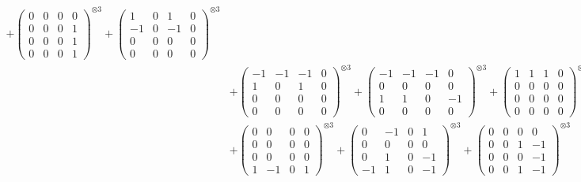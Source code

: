 \documentclass{article}
\begin{document}
{\begin{align}
            + \begin{pmatrix} 0 & 0 & 0 & 0 \\ 0 & 0 & 0 & 1 \\ 0 & 0 & 0 & 1 \\ 0 & 0 & 0 & 1 \end{pmatrix}^{\otimes 3} 
            + \begin{pmatrix} 1 & 0 & 1 & 0 \\ -1 & 0 & -1 & 0 \\ 0 & 0 & 0 & 0 \\ 0 & 0 & 0 & 0 \end{pmatrix}^{\otimes 3} \\
        &+ \label{Rs16-Rc11-Solution-16-c10} \begin{pmatrix} -1 & -1 & -1 & 0 \\ 1 & 0 & 1 & 0 \\ 0 & 0 & 0 & 0 \\ 0 & 0 & 0 & 0 \end{pmatrix}^{\otimes 3} 
            + \begin{pmatrix} -1 & -1 & -1 & 0 \\ 0 & 0 & 0 & 0 \\ 1 & 1 & 0 & -1 \\ 0 & 0 & 0 & 0 \end{pmatrix}^{\otimes 3} 
            + \begin{pmatrix} 1 & 1 & 1 & 0 \\ 0 & 0 & 0 & 0 \\ 0 & 0 & 0 & 0 \\ 0 & 0 & 0 & 0 \end{pmatrix}^{\otimes 3} \\
        &+ \label{Rs16-Rc11-Solution-16-c13} \begin{pmatrix} 0 & 0 & 0 & 0 \\ 0 & 0 & 0 & 0 \\ 0 & 0 & 0 & 0 \\ 1 & -1 & 0 & 1 \end{pmatrix}^{\otimes 3} 
            + \begin{pmatrix} 0 & -1 & 0 & 1 \\ 0 & 0 & 0 & 0 \\ 0 & 1 & 0 & -1 \\ -1 & 1 & 0 & -1 \end{pmatrix}^{\otimes 3} 
            + \begin{pmatrix} 0 & 0 & 0 & 0 \\ 0 & 0 & 1 & -1 \\ 0 & 0 & 0 & -1 \\ 0 & 0 & 1 & -1 \end{pmatrix}^{\otimes 3} \\

\end{align}}
\end{document}
